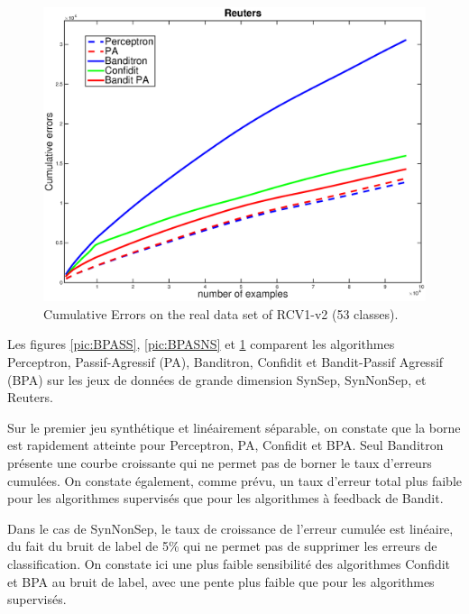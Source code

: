 \documentclass[twocolumn]{article}
\begin{document}
\begin{figure}[ht!]
	\centerline{
		\includegraphics[width=\linewidth]{figs/RCV1_v2_53class.eps}}
	\caption{Cumulative Errors  on the real data set of RCV1-v2 (53 classes).}
	\label{pic:BPARCV}
\end{figure}

Les figures \ref{pic:BPASS}, \ref{pic:BPASNS} et \ref{pic:BPARCV} comparent les algorithmes Perceptron, Passif-Agressif (PA), Banditron, Confidit et Bandit-Passif Agressif (BPA) sur les jeux de données de grande dimension SynSep, SynNonSep, et Reuters. 

Sur le premier jeu synthétique et linéairement séparable, on constate que la borne est rapidement atteinte pour Perceptron, PA, Confidit et BPA. Seul Banditron présente une courbe croissante qui ne permet pas de borner le taux d'erreurs cumulées.  On constate également, comme prévu, un taux d'erreur total plus faible pour les algorithmes supervisés que pour les algorithmes à feedback de Bandit.

Dans le cas de SynNonSep, le taux de croissance de l'erreur cumulée est linéaire, du fait du bruit de label de 5\% qui ne permet pas de supprimer les erreurs de classification. On constate ici une plus faible sensibilité des algorithmes Confidit et BPA au bruit de label, avec une pente plus faible que pour les algorithmes supervisés.

\end{document}
